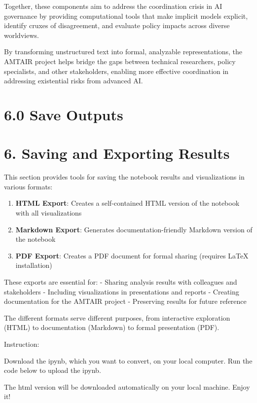 \documentclass[
  11pt,
  letterpaper,
]{book}
\providecommand{\tightlist}{%
  \setlength{\itemsep}{0pt}\setlength{\parskip}{0pt}}
\begin{document}
Together, these components aim to address the coordination crisis in AI
governance by providing computational tools that make implicit models
explicit, identify cruxes of disagreement, and evaluate policy impacts
across diverse worldviews.

By transforming unstructured text into formal, analyzable
representations, the AMTAIR project helps bridge the gaps between
technical researchers, policy specialists, and other stakeholders,
enabling more effective coordination in addressing existential risks
from advanced AI.

\chapter{6.0 Save Outputs}\label{save-outputs}

\chapter{6. Saving and Exporting
Results}\label{saving-and-exporting-results}

This section provides tools for saving the notebook results and
visualizations in various formats:

\begin{enumerate}
\def\labelenumi{\arabic{enumi}.}
\tightlist
\item
  \textbf{HTML Export}: Creates a self-contained HTML version of the
  notebook with all visualizations
\item
  \textbf{Markdown Export}: Generates documentation-friendly Markdown
  version of the notebook
\item
  \textbf{PDF Export}: Creates a PDF document for formal sharing
  (requires LaTeX installation)
\end{enumerate}

These exports are essential for: - Sharing analysis results with
colleagues and stakeholders - Including visualizations in presentations
and reports - Creating documentation for the AMTAIR project - Preserving
results for future reference

The different formats serve different purposes, from interactive
exploration (HTML) to documentation (Markdown) to formal presentation
(PDF).

Instruction:

Download the ipynb, which you want to convert, on your local computer.
Run the code below to upload the ipynb.

The html version will be downloaded automatically on your local machine.
Enjoy it!
\end{document}
